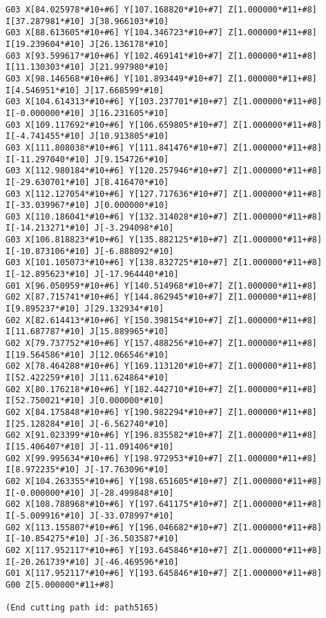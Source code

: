 \begin{lstlisting}[caption={App4-Display full listing for 2D KSG G-Code}, label=App4-Display full listing for 2D KSG G-Code]
G03 X[84.025978*#10+#6] Y[107.168820*#10+#7] Z[1.000000*#11+#8] I[37.287981*#10] J[38.966103*#10]
G03 X[88.613605*#10+#6] Y[104.346723*#10+#7] Z[1.000000*#11+#8] I[19.239604*#10] J[26.136178*#10]
G03 X[93.599617*#10+#6] Y[102.469141*#10+#7] Z[1.000000*#11+#8] I[11.130303*#10] J[21.997980*#10]
G03 X[98.146568*#10+#6] Y[101.893449*#10+#7] Z[1.000000*#11+#8] I[4.546951*#10] J[17.668599*#10]
G03 X[104.614313*#10+#6] Y[103.237701*#10+#7] Z[1.000000*#11+#8] I[-0.000000*#10] J[16.231605*#10]
G03 X[109.117692*#10+#6] Y[106.659805*#10+#7] Z[1.000000*#11+#8] I[-4.741455*#10] J[10.913805*#10]
G03 X[111.808038*#10+#6] Y[111.841476*#10+#7] Z[1.000000*#11+#8] I[-11.297040*#10] J[9.154726*#10]
G03 X[112.980184*#10+#6] Y[120.257946*#10+#7] Z[1.000000*#11+#8] I[-29.630701*#10] J[8.416470*#10]
G03 X[112.127054*#10+#6] Y[127.717636*#10+#7] Z[1.000000*#11+#8] I[-33.039967*#10] J[0.000000*#10]
G03 X[110.186041*#10+#6] Y[132.314028*#10+#7] Z[1.000000*#11+#8] I[-14.213271*#10] J[-3.294098*#10]
G03 X[106.818823*#10+#6] Y[135.882125*#10+#7] Z[1.000000*#11+#8] I[-10.873106*#10] J[-6.888092*#10]
G03 X[101.105073*#10+#6] Y[138.832725*#10+#7] Z[1.000000*#11+#8] I[-12.895623*#10] J[-17.964440*#10]
G01 X[96.050959*#10+#6] Y[140.514968*#10+#7] Z[1.000000*#11+#8]
G02 X[87.715741*#10+#6] Y[144.862945*#10+#7] Z[1.000000*#11+#8] I[9.895237*#10] J[29.132934*#10]
G02 X[82.614413*#10+#6] Y[150.398154*#10+#7] Z[1.000000*#11+#8] I[11.687787*#10] J[15.889965*#10]
G02 X[79.737752*#10+#6] Y[157.488256*#10+#7] Z[1.000000*#11+#8] I[19.564586*#10] J[12.066546*#10]
G02 X[78.464288*#10+#6] Y[169.113120*#10+#7] Z[1.000000*#11+#8] I[52.422259*#10] J[11.624864*#10]
G02 X[80.176218*#10+#6] Y[182.442710*#10+#7] Z[1.000000*#11+#8] I[52.750021*#10] J[0.000000*#10]
G02 X[84.175848*#10+#6] Y[190.982294*#10+#7] Z[1.000000*#11+#8] I[25.128284*#10] J[-6.562740*#10]
G02 X[91.023399*#10+#6] Y[196.835582*#10+#7] Z[1.000000*#11+#8] I[15.406407*#10] J[-11.091406*#10]
G02 X[99.995634*#10+#6] Y[198.972953*#10+#7] Z[1.000000*#11+#8] I[8.972235*#10] J[-17.763096*#10]
G02 X[104.263355*#10+#6] Y[198.651605*#10+#7] Z[1.000000*#11+#8] I[-0.000000*#10] J[-28.499848*#10]
G02 X[108.788968*#10+#6] Y[197.641175*#10+#7] Z[1.000000*#11+#8] I[-5.009916*#10] J[-33.078997*#10]
G02 X[113.155807*#10+#6] Y[196.046682*#10+#7] Z[1.000000*#11+#8] I[-10.854275*#10] J[-36.503587*#10]
G02 X[117.952117*#10+#6] Y[193.645846*#10+#7] Z[1.000000*#11+#8] I[-20.261739*#10] J[-46.469596*#10]
G01 X[117.952117*#10+#6] Y[193.645846*#10+#7] Z[1.000000*#11+#8]
G00 Z[5.000000*#11+#8]

(End cutting path id: path5165)


\end{lstlisting}
